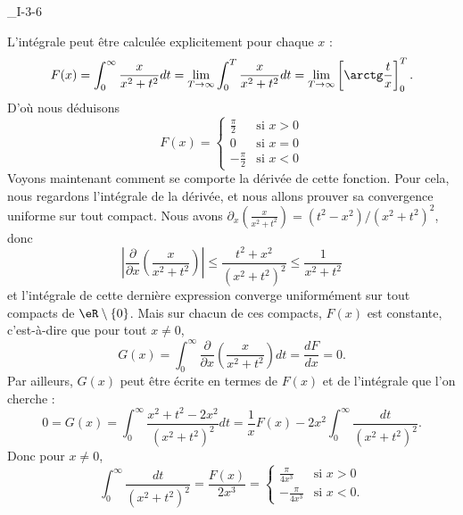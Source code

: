 

\begin{corrige}{_I-3-6}

L'intégrale peut être calculée explicitement pour chaque $x$ :
\begin{equation}
	F(x)=\int_0^{\infty}\frac{ x }{ x^2+t^2 }dt=\lim_{T\to\infty}\int_0^{T}\frac{ x }{ x^2+t^2 }dt=\lim_{T\to\infty}\left[ \arctg\frac{ t }{ x } \right]_0^T.
\end{equation}
D'où nous déduisons
\begin{equation}
	F(x)=\begin{cases}
	\frac{ \pi }{ 2 }	&	\text{si }x>0\\
	0			&	\text{si }x=0\\
	-\frac{ \pi }{2}	&	\text{si }x<0
\end{cases}
\end{equation}
Voyons maintenant comment se comporte la dérivée de cette fonction. Pour cela, nous regardons l'intégrale de la dérivée, et nous allons prouver sa convergence uniforme sur tout compact. Nous avons $\partial_x\left(\frac{ x }{ x^2+t^2 }\right)=(t^2-x^2)/(x^2+t^2)^2$, donc
\begin{equation}
	\left| \frac{ \partial  }{ \partial x }\left(\frac{ x }{ x^2+t^2 }\right) \right| \leq \frac{ t^2+x^2 }{ (x^2+t^2)^2 }\leq \frac{1}{ x^2+t^2 }
\end{equation}
et l'intégrale de cette dernière expression converge uniformément sur tout compacts de $\eR\setminus\{ 0 \}$. Mais sur chacun de ces compacts, $F(x)$ est constante, c'est-à-dire que pour tout $x\neq 0$,
\begin{equation}
	G(x)=\int_0^{\infty}\frac{ \partial  }{ \partial x }\left( \frac{ x }{ x^2+t^2 } \right)dt=\frac{ dF }{ dx }=0.
\end{equation}
Par ailleurs, $G(x)$ peut être écrite en termes de $F(x)$ et de l'intégrale que l'on cherche :
\begin{equation}
	0=G(x)=\int_0^{\infty}\frac{ x^2+t^2-2x^2 }{ (x^2+t^2)^2 }dt=\frac{1}{ x }F(x)-2x^2\int_0^{\infty}\frac{ dt }{ (x^2+t^2)^2 }.
\end{equation}
Donc pour $x\neq 0$,
\begin{equation}
	\int_0^{\infty}\frac{ dt }{ (x^2+t^2)^2 }=\frac{ F(x) }{ 2x^3 }=\begin{cases}
	\frac{ \pi }{ 4x^3 }	&	\text{si }x>0\\
	-\frac{ \pi }{ 4x^3 }	&	 \text{si }x<0.
\end{cases}
\end{equation}

\end{corrige}
